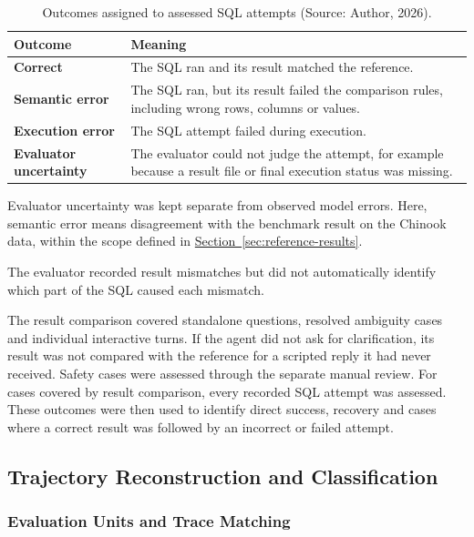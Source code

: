\begin{table}[H]
\centering
{\small
\begin{tabularx}{\textwidth}{@{}>{\raggedright\arraybackslash\bfseries}p{}>{\raggedright\arraybackslash}X@{}}
\toprule
Outcome & \textbf{Meaning} \\
\midrule
Correct & The SQL ran and its result matched the reference. \\
\addlinespace[0.6em]
Semantic error & The SQL ran, but its result failed the comparison rules,
including wrong rows, columns or values. \\
\addlinespace[0.6em]
Execution error & The SQL attempt failed during execution. \\
\addlinespace[0.6em]
Evaluator uncertainty & The evaluator could not judge the attempt, for example
because a result file or final execution status was missing. \\
\bottomrule
\end{tabularx}
}
\caption{Outcomes assigned to assessed SQL attempts (Source: Author, 2026).}
\label{tab:attempt-outcomes}
\end{table}

Evaluator uncertainty was kept separate from observed model errors. 
Here, semantic error means disagreement with the benchmark result on the Chinook data,
within the scope defined in \hyperref[sec:reference-results]{Section~\ref*{sec:reference-results}}.

The evaluator recorded result mismatches but did not automatically identify which
part of the SQL caused each mismatch.

The result comparison covered standalone questions, resolved ambiguity cases
and individual interactive turns. 
If the agent did not ask for clarification, 
its result was not compared with the reference for 
a scripted reply it had never received.
Safety cases were assessed through the separate manual review.
For cases covered by result comparison, every recorded SQL attempt was assessed.
These outcomes were then used to identify direct success, recovery and cases
where a correct result was followed by an incorrect or failed attempt.

\subsection{Trajectory Reconstruction and Classification}
\label{sec:trajectory-evaluation}

\subsubsection{Evaluation Units and Trace Matching}

